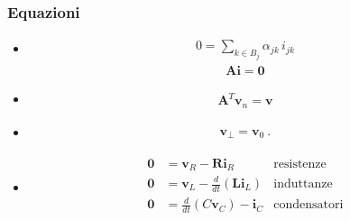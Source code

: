 \documentclass[letterpaper,10pt,english]{jupyterBook}
\begin{document}
\subsubsection*{Equazioni}
\begin{itemize}
\item {} 
\sphinxAtStartPar
{}
\begin{equation*}
\begin{split}0 = \sum_{k \in B_j} \alpha_{jk} \, i_{jk}\end{split}
\end{equation*}\begin{equation*}
\begin{split}\mathbf{A} \mathbf{i} = \mathbf{0}\end{split}
\end{equation*}
\item {} 
\sphinxAtStartPar
{}
\begin{equation*}
\begin{split}\mathbf{A}^T \mathbf{v}_{n} = \mathbf{v}\end{split}
\end{equation*}
\item {} 
\sphinxAtStartPar
{}
\begin{equation*}
\begin{split}\mathbf{v}_{\perp} = \mathbf{v}_0 \ .\end{split}
\end{equation*}
\item {} 
\sphinxAtStartPar
{}
\begin{equation*}
\begin{split}\begin{aligned}
    \mathbf{0} & = \mathbf{v}_R - \mathbf{R} \mathbf{i}_R & \text{resistenze} \\
    \mathbf{0} & = \mathbf{v}_L - \frac{d}{dt} \left( \mathbf{L} \mathbf{i}_L \right) & \text{induttanze} \\
    \mathbf{0} & = \frac{d}{dt} \left( C \mathbf{v}_C \right) - \mathbf{i}_C & \text{condensatori} \\
  \end{aligned}\end{split}
\end{equation*}
\end{itemize}

\sphinxstepscope
\end{document}
